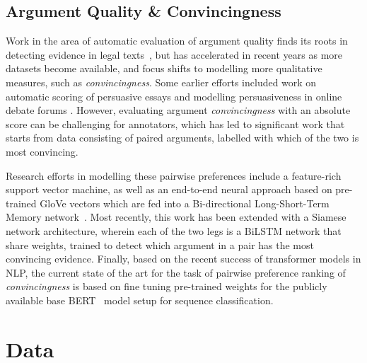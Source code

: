 \documentclass[runningheads]{llncs}
\begin{document}
\subsection{Argument Quality \& Convincingness}

Work in the area of automatic evaluation of argument quality finds its roots in 
detecting evidence in legal texts~\cite{moens_automatic_2007}, but has 
accelerated in recent years as more datasets become available, and focus shifts 
to modelling more qualitative measures, such as \textit{convincingness}. 
Some earlier efforts included work on automatic scoring of persuasive essays 
\cite{persing_end--end_2016} and modelling persuasiveness in online debate 
forums \cite{tan_winning_2016}. 
However, evaluating argument \textit{convincingness} with an absolute score can 
be challenging for annotators, which has led to significant work that starts 
from data consisting of paired arguments, labelled with which of the two is 
most convincing.

Research efforts in modelling these pairwise preferences include a feature-rich 
support vector machine, as well as an end-to-end neural approach based on 
pre-trained GloVe vectors\cite{pennington_glove:_2014} which are fed into 
a Bi-directional Long-Short-Term Memory network~\cite{habernal_which_2016}. 
Most recently, this work has been extended with a Siamese network architecture, 
wherein each of the two legs is a BiLSTM network that share weights, 
trained to detect which argument in a pair has the most convincing 
evidence\cite{gleize_are_2019}.
Finally, based on the recent success of transformer models in NLP, the current 
state of the art for the task of pairwise preference ranking of 
\textit{convincingness} is based on fine tuning pre-trained weights for the 
publicly available base BERT~\cite{devlin_bert_2018} model setup for sequence 
classification\cite{toledo_automatic_2019}.


\section{Data}
\end{document}
